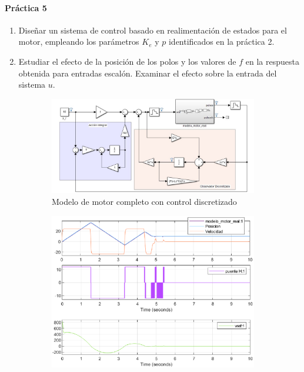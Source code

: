 \documentclass[10pt,a4paper]{report}
\begin{document}
\paragraph{Práctica 5}
\begin{enumerate}
\item Diseñar un sistema de control basado en realimentación de estados para el motor, empleando los parámetros $K_e$ y $p$ identificados en la práctica 2.
\item Estudiar el efecto de la posición de los polos y los valores de $f$ en la respuesta obtenida para entradas escalón. Examinar el efecto sobre la entrada del sistema $u$. 
\end{enumerate}

\begin{figure}
\centering
\begin{subfigure}{0.6\textwidth}
\includegraphics[width=\textwidth]{motor_controlado.jpg}
\caption{Modelo de motor completo con control discretizado}
\label{f35a}
\end{subfigure}
\begin{subfigure}{0.6\textwidth}
\includegraphics[width=\textwidth]{motor_controlado.eps}

\end{subfigure}
\end{figure}
\end{document}
